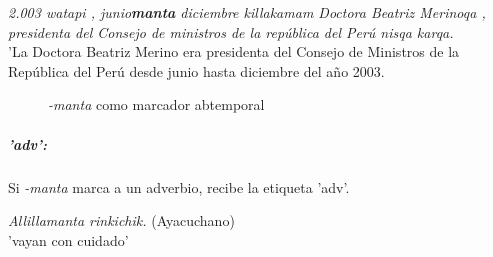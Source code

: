\documentclass[a4paper,11pt,DIV12]{scrartcl}
\begin{document}
\begin{examples}
 \item\label{Ex:mantatmp} {\em 2.003 watapi , junio\textbf{manta} diciembre killakamam Doctora Beatriz Merinoqa , presidenta del Consejo de ministros de la república del Perú nisqa karqa.}\\
    'La Doctora Beatriz Merino era presidenta del Consejo de Ministros de la Rep\'ublica del Per\'u desde junio hasta diciembre del a\~no 2003.\\
          	 \hfill{\small \citep{Defensora}}
\end{examples}


\begin{figure}
 \begin{center}
\end{center}
\caption{{\em -manta} como marcador abtemporal}\label{Fig:mantatmp}
\end{figure}

\subparagraph{'adv':}
Si {\em -manta} marca a un adverbio, recibe la etiqueta 'adv'.

\begin{examples}
 \item {\em Allillamanta rinkichik.} (Ayacuchano)\\
      'vayan con cuidado'\\
 \hfill {\small \citep[171]{Soto76a}}
\end{examples}
\end{document}
